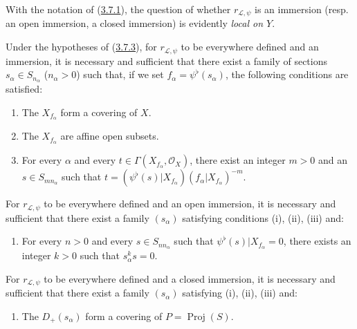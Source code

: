 \begin{env}[3.8.1]
\label{II.3.8.1}
With the notation of (\hyperref[II.3.7.1]{3.7.1}), the question of whether
$r_{\mathcal{L},\psi}$ is an immersion (resp. an open immersion, a
closed immersion) is evidently \emph{local on $Y$}.
\end{env}

\begin{proposition}[3.8.2]
\label{II.3.8.2}
Under the hypotheses of \textup{(\hyperref[II.3.7.3]{3.7.3})}, for
$r_{\mathcal{L},\psi}$ to be everywhere defined and an immersion, it is
necessary and sufficient that there exist a family of sections
$s_\alpha\in S_{n_\alpha}$ ($n_\alpha>0$) such that, if we set
$f_\alpha=\psi^\flat(s_\alpha)$, the following conditions are satisfied:
\begin{enumerate}
  \item[\textup{(i)}] The $X_{f_\alpha}$ form a covering of $X$.
  \item[\textup{(ii)}] The $X_{f_\alpha}$ are affine open subsets.
  \item[\textup{(iii)}] For every $\alpha$ and every
    $t\in\Gamma(X_{f_\alpha},\mathcal{O}_X)$, there exist an integer $m>0$ and
    an $s\in S_{mn_\alpha}$ such that
    $t=(\psi^\flat(s)|X_{f_\alpha})(f_\alpha|X_{f_\alpha})^{-m}$.
\end{enumerate}

For $r_{\mathcal{L},\psi}$ to be everywhere defined and an open
immersion, it is necessary and sufficient that there exist a family
$(s_\alpha)$ satisfying conditions \textup{(i), (ii), (iii)} and:
\begin{enumerate}
  \item[\textup{(iv)}] For every $n>0$ and every $s\in S_{nn_\alpha}$ such that
    $\psi^\flat(s)|X_{f_\alpha}=0$, there exists an integer $k>0$ such that
    $s_\alpha^ks=0$.
\end{enumerate}

For $r_{\mathcal{L},\psi}$ to be everywhere defined and a closed
immersion, it is necessary and sufficient that there exist a family
$(s_\alpha)$ satisfying \textup{(i), (ii), (iii)} and:
\begin{enumerate}
  \item[\textup{(v)}] The $D_+(s_\alpha)$ form a covering of
    $P=\operatorname{Proj}(S)$.
\end{enumerate}
\end{proposition}

